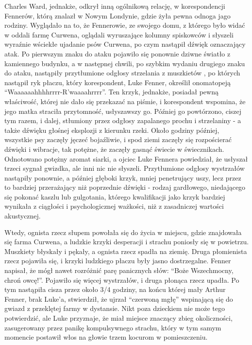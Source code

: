 Charles Ward, jednakże, odkrył inną ogólnikową relację, w korespondencji Fennerów, którą znalazł w Nowym Londynie, gdzie żyła pewna odnoga jago rodziny. Wyglądało na to, że Fennerowie, ze swojego domu, z którego było widać w oddali farmę Curwena, oglądali wyruszające kolumny spiskowców i słyszeli wyraźnie wściekłe ujadanie psów Curwena, po czym nastąpił dźwięk oznaczający atak. Po pierwszym znaku do ataku pojawiło się ponownie dziwne światło z kamiennego budynku, a w następnej chwili, po szybkim wydaniu drugiego znaku do ataku, nastąpiły przytłumione odgłosy strzelania z muszkietów , po których nastąpił ryk płaczu, który korespondent, Luke Fenner, określił onomatopeją ``Waaaaaahhhhrrrr-R'waaaahrrrr''. Ten krzyk, jednakże, posiadał pewną właściwość, której nie dało się przekazać na piśmie, i korespondent wspomina, że jego matka straciła przytomność, usłyszawszy go. Później go powtórzono, ciszej tym razem, i dalej, stłumiony przez odgłosy zapalanego prochu i strzelaniny - a także dźwięku głośnej eksplozji z kierunku rzeki. Około godziny później, wszystkie psy zaczęły jęczeć bojaźliwie, i spod ziemi zaczęły się rozpościerać dźwięki i wibracje, tak potężne, że zaczęły gasnąć świecie w świecznikach. Odnotowano potężny aromat siarki, a ojciec Luke Fennera powiedział, że usłyszał trzeci sygnał gwizdka, ale inni nic nie słyszeli. Przytłumione odgłosy wystrzałów nastąpiły ponownie, a później głęboki krzyk, mniej penetrujący uszy, lecz przez to bardziej przerażający niż poprzednie dźwięki - rodzaj gardłowego, niedającego się pokonać kaszlu lub gulgotania, którego kwalifikacji jako krzyk bardziej wynikała z ciągłości i psychologicznej ważkości, niż z zasadniczej wartości akustycznej.

Wtedy, ognista rzecz słupem powołała się do życia w miejscu, gdzie znajdowała się farma Curwena, a ludzkie krzyki desperacji i strachu poniosły się w powietrzu. Muszkiety błyskały i pękały, a ognista rzecz spadła na ziemię. Druga płomienista rzecz pojawiła się, i krzyki ludzkiego płaczu były jasno dostrzegalne. Fenner napisał, że mógł nawet rozróżnić parę panicznych słów: ``Boże Wszechmocny, chroń owcę!''. Pojawiło się więcej wystrzałów, i druga płonąca rzecz upadła. Po tym nastąpiła cisza przez około 3/4 godziny, na końcu której mały Arthur Fenner, brak Luke'a, stwierdził, że ujrzał ``czerwoną mgłę'' wspinającą się do gwiazd z przeklętej farmy w dystansie. Nikt poza dzieckiem nie może tego potwierdzić, ale Luke przyznaje, że miał miejsce znaczący zbieg okoliczności, zasugerowany przez panikę kompulsywnego strachu, który w tym samym momencie postawił włos na głowie trzem kocurom w pomieszczeniu. 


